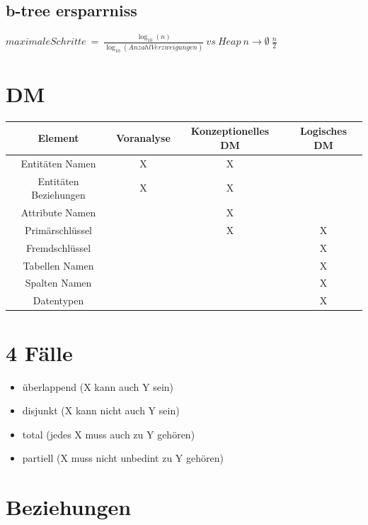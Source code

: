 \documentclass[a4paper,8pt]{article} %
\begin{document}
\begin{small}
\begin{minipage}{0.68 \linewidth}
		\subsection{b-tree ersparrniss}
		$
		maximale Schritte\ =\ \frac{
			\log_{10} (n)
		}{
			\log_{10} (Anzahl Verzweigungen)
		}\ vs\ Heap\ n \rightarrow \emptyset\ \frac{n}{2}
		$
		\section{DM}
			\begin{tabular}{c|c|c|c}
				Element					&Voranalyse	&Konzeptionelles DM	&Logisches DM\\\hline\hline
				Entitäten Namen			&X			&X					&\\\hline
				Entitäten Beziehungen	&X			&X					&\\\hline
				Attribute Namen			&			&X					&\\\hline
				Primärschlüssel			&			&X					&X\\\hline
				Fremdschlüssel			&			&					&X\\\hline
				Tabellen Namen			&			&					&X\\\hline
				Spalten Namen			&			&					&X\\\hline
				Datentypen				&			&					&X\\\hline
			\end{tabular}
			\section{4 Fälle}
			\begin{itemize}
				\item überlappend (X kann auch Y sein)
				\item disjunkt (X kann nicht auch Y sein)
				\item total (jedes X muss auch zu Y gehören)
				\item partiell (X muss nicht unbedint zu Y gehören)
			\end{itemize}
	\section{Beziehungen}

\end{minipage}
\end{small}
\end{document}

